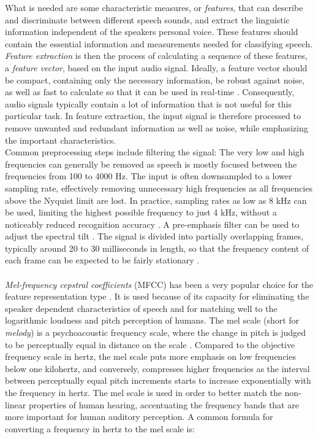 \documentclass[english, 12pt, a4paper, pdftex, elec, utf8]{aaltothesis}
\begin{document}
What is needed are some characteristic measures, or \textit{features}, that can describe and discriminate between different speech sounds, and extract the linguistic information independent of the speakers personal voice. These features should contain the essential information and measurements needed for classifying speech. \textit{Feature extraction} is then the process of calculating a sequence of these features, a \textit{feature vector}, based on the input audio signal. Ideally, a feature vector should be compact, containing only the necessary information, be robust against noise, as well as fast to calculate so that it can be used in real-time \cite{huang2001spoken}. Consequently, audio signals typically contain a lot of information that is not useful for this particular task. In feature extraction, the input signal is therefore processed to remove unwanted and redundant information as well as noise, while emphasizing the important characteristics. \\
Common preprocessing steps include filtering the signal: The very low and high frequencies can generally be removed as speech is mostly focused between the frequencies from 100 to 4000 Hz. The input is often downsampled to a lower sampling rate, effectively removing unnecessary high frequencies as all frequencies above the Nyquist limit are lost. In practice, sampling rates as low as 8 kHz can be used, limiting the highest possible frequency to just 4 kHz, without a noticeably reduced recognition accuracy \cite{huang2001spoken}. A pre-emphasis filter can be used to adjust the spectral tilt \cite{kallasjoki2016}. The signal is divided into partially overlapping frames, typically around 20 to 30 milliseconds in length, so that the frequency content of each frame can be expected to be fairly stationary \cite{huang2001spoken, gales2008application}. \\\\
\textit{Mel-frequency cepstral coefficients} (MFCC) has been a very popular choice for the feature representation type \cite{yu2014automatic, gales2008application, kallasjoki2016}. It is used because of its capacity for eliminating the speaker dependent characteristics of speech and for matching well to the logarithmic loudness and pitch perception of humans. The mel scale (short for \textit{melody}) is a psychoacoustic frequency scale, where the change in pitch is judged to be perceptually equal in distance on the scale \cite[p.~174]{pulkki2015communication}. Compared to the objective frequency scale in hertz, the mel scale puts more emphasis on low frequencies below one kilohertz, and conversely, compresses higher frequencies as the interval between perceptually equal pitch increments starts to increase exponentially with the frequency in hertz. The mel scale is used in order to better match the non-linear properties of human hearing, accentuating the frequency bands that are more important for human auditory perception. A common formula for converting a frequency in hertz to the mel scale is:
\end{document}
